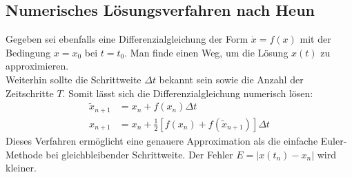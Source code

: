 	\subsection{Numerisches Lösungsverfahren nach Heun}
		Gegeben sei ebenfalls eine Differenzialgleichung der Form $\dot{x} = f(x)$ mit der Bedingung $x = x_0$ bei $t = t_0$. Man finde einen Weg, um die Lösung $x(t)$ zu approximieren.\\
		Weiterhin sollte die Schrittweite $\Delta t$ bekannt sein sowie die Anzahl der Zeitschritte $T$. Somit lässt sich die Differenzialgleichung numerisch lösen:
		\begin{align}
			\label{eq:erw_euler}
			\tilde{x}_{n+1} &= x_n + f(x_n) \Delta t\\
			x_{n+1} &= x_n + \tfrac{1}{2}[f(x_n) + f(\tilde{x}_{n+1})]\Delta t
		\end{align}
		Dieses Verfahren ermöglicht eine genauere Approximation als die einfache Euler-Methode bei gleichbleibender Schrittweite. Der Fehler $E = |x(t_n)-x_n|$ wird kleiner.
